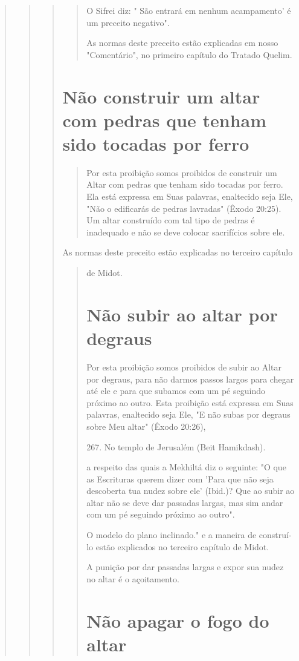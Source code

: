 \begin{quote}
\begin{quote}
\begin{quote}
\begin{quote}
O Sifrei diz: " São entrará em nenhum acampamento' é um precei­to
negativo".

As normas deste preceito estão explicadas em nosso "Comentário", no
primeiro capítulo do Tratado Quelim.
\end{quote}

\section{Não construir um altar com pedras que tenham sido tocadas por ferro}

\begin{quote}
Por esta proibição somos proibidos de construir um Altar com pe­dras que
tenham sido tocadas por ferro. Ela está expressa em Suas palavras,
enal­tecido seja Ele, "Não o edificarás de pedras lavradas" (Êxodo
20:25). Um altar construído com tal tipo de pedras é inadequado e não se
deve colocar sacrifí­cios sobre ele.
\end{quote}

As normas deste preceito estão explicadas no terceiro capítulo

\begin{quote}
de Midot.

\section{Não subir ao altar por degraus}

Por esta proibição somos proibidos de subir ao Altar por degraus, para
não darmos passos largos para chegar até ele e para que subamos com um
pé seguindo próximo ao outro. Esta proibição está expressa em Suas
palavras, enaltecido seja Ele, "E não subas por degraus sobre Meu altar"
(Êxodo 20:26),

267. No templo de Jerusalém (Beit Hamikdash).

a respeito das quais a Mekhiltá diz o seguinte: "O que as Escrituras
querem di­zer com 'Para que não seja descoberta tua nudez sobre ele'
(Ibid.)? Que ao su­bir ao altar não se deve dar passadas largas, mas sim
andar com um pé seguindo próximo ao outro".

O modelo do plano inclinado." e a maneira de
construí-lo estão ex­plicados no terceiro capítulo de Midot.

A punição por dar passadas largas e expor sua nudez no altar é o
açoitamento.

\section{Não apagar o fogo do altar}


\end{quote}
\end{quote}
\end{quote}
\end{quote}
